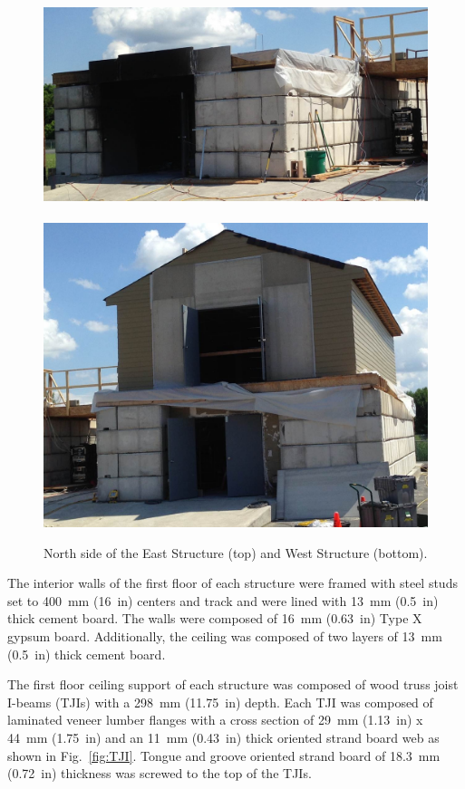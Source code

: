\documentclass[12pt,oneside]{book}
\begin{document}
\begin{figure}[!ht]
	\includegraphics[width=5.25in]{../../Hose_Stream_Tests/Figures/Pictures/east_structure}
	\\~\\
	\includegraphics[width=5.25in]{../../Hose_Stream_Tests/Figures/Pictures/west_structure}
	\caption[North side of the East and West Structures.]{North side of the East Structure (top) and West Structure (bottom).}
	\label{fig:struct_pics}
\end{figure}

The interior walls of the first floor of each structure were framed with steel studs set to 400~mm (16~in) centers and track and were lined with 13~mm (0.5~in) thick cement board. The walls were composed of 16~mm (0.63~in) Type X gypsum board. Additionally, the ceiling was composed of two layers of 13~mm (0.5~in) thick cement board.
\FloatBarrier

The first floor ceiling support of each structure was composed of wood truss joist I-beams (TJIs) with a 298~mm (11.75~in) depth. Each TJI was composed of laminated veneer lumber flanges with a cross section of 29~mm (1.13~in) x 44~mm (1.75~in) and an 11~mm (0.43~in) thick oriented strand board web as shown in Fig.~\ref{fig:TJI}. Tongue and groove oriented strand board of 18.3~mm (0.72~in) thickness was screwed to the top of the TJIs.
\end{document}
